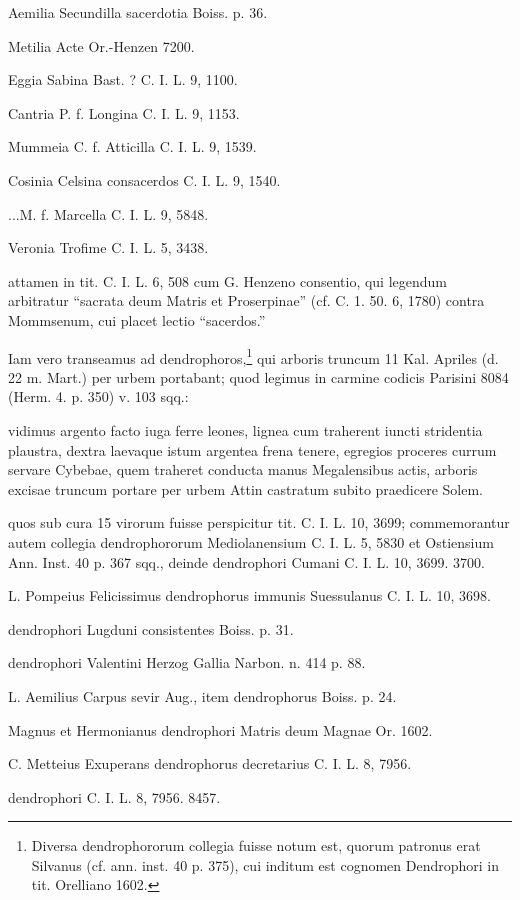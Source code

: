 \documentclass[a4paper, 11pt, oneside, polutonikogreek, german, twocolumn]{article}
\begin{document}
Aemilia Secundilla sacerdotia Boiss. p. 36.

Metilia Acte Or.-Henzen 7200.

Eggia Sabina Bast. ? C. I. L. 9, 1100.

Cantria P. f. Longina C. I. L. 9, 1153.

Mummeia C. f. Atticilla C. I. L. 9, 1539.

Cosinia Celsina consacerdos C. I. L. 9, 1540.

...M. f. Marcella C. I. L. 9, 5848.

Veronia Trofime C. I. L. 5, 3438.

attamen in tit. C. I. L. 6, 508 cum G. Henzeno consentio, qui legendum arbitratur "`sacrata deum Matris et Proserpinae"' (cf. C. 1. 50. 6, 1780) contra Mommsenum, cui placet lectio "`sacerdos."'

Iam vero transeamus ad dendrophoros,\footnote{Diversa dendrophororum collegia fuisse notum est, quorum patronus erat Silvanus (cf. ann. inst. 40 p. 375), cui inditum est cognomen Dendrophori in tit. Orelliano 1602.} qui arboris truncum 11 Kal. Apriles (d. 22 m. Mart.) per urbem portabant; quod legimus in carmine codicis Parisini 8084 (Herm. 4. p. 350) v. 103 sqq.:

vidimus argento facto iuga ferre leones,  lignea cum traherent iuncti stridentia plaustra,  dextra laevaque istum argentea frena tenere,  egregios proceres currum servare Cybebae,  quem traheret conducta manus Megalensibus actis,  arboris excisae truncum portare per urbem  Attin castratum subito praedicere Solem.

quos sub cura 15 virorum fuisse perspicitur tit. C. I. L. 10, 3699; commemorantur autem collegia dendrophororum Mediolanensium C. I. L. 5, 5830 et Ostiensium Ann. Inst. 40 p. 367 sqq., deinde dendrophori Cumani C. I. L. 10, 3699. 3700.

L. Pompeius Felicissimus dendrophorus immunis Suessulanus C. I. L. 10, 3698.

dendrophori Lugduni consistentes Boiss. p. 31.

dendrophori Valentini Herzog Gallia Narbon. n. 414 p. 88.

L. Aemilius Carpus sevir Aug., item dendrophorus Boiss. p. 24.

Magnus et Hermonianus dendrophori Matris deum Magnae Or. 1602.

C. Metteius Exuperans dendrophorus decretarius C. I. L. 8, 7956.

dendrophori C. I. L. 8, 7956. 8457.
\end{document}
